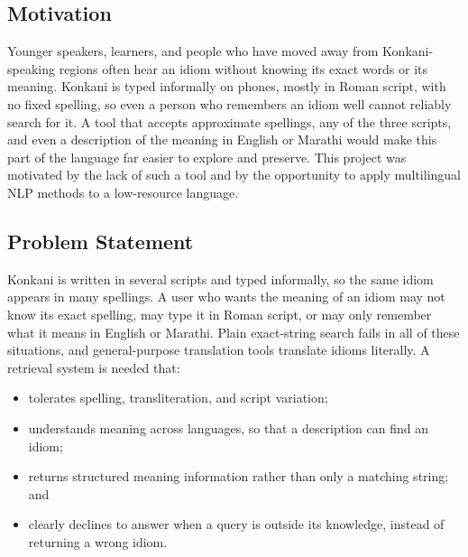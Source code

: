 \documentclass[12pt,a4paper]{article}
\begin{document}
\subsection{Motivation}
Younger speakers, learners, and people who have moved away from Konkani-speaking regions often hear an idiom without knowing its exact words or its meaning. Konkani is typed informally on phones, mostly in Roman script, with no fixed spelling, so even a person who remembers an idiom well cannot reliably search for it. A tool that accepts approximate spellings, any of the three scripts, and even a description of the meaning in English or Marathi would make this part of the language far easier to explore and preserve. This project was motivated by the lack of such a tool and by the opportunity to apply multilingual NLP methods to a low-resource language.

\subsection{Problem Statement}
Konkani is written in several scripts and typed informally, so the same idiom appears in many spellings. A user who wants the meaning of an idiom may not know its exact spelling, may type it in Roman script, or may only remember what it means in English or Marathi. Plain exact-string search fails in all of these situations, and general-purpose translation tools translate idioms literally. A retrieval system is needed that:
\begin{itemize}
  \item tolerates spelling, transliteration, and script variation;
  \item understands meaning across languages, so that a description can find an idiom;
  \item returns structured meaning information rather than only a matching string; and
  \item clearly declines to answer when a query is outside its knowledge, instead of returning a wrong idiom.
\end{itemize}
\end{document}
